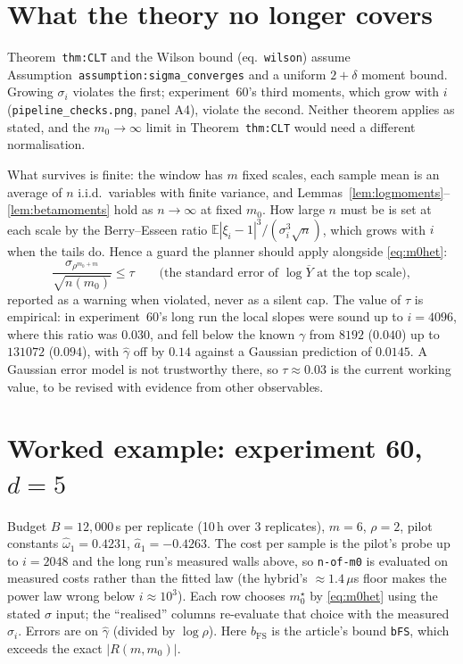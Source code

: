 \documentclass[11pt]{article}
\newcommand{\E}{\mathbb{E}}
\newcommand{\bFS}{b_{\mathrm{FS}}}
\begin{document}
\section{What the theory no longer covers}\label{sec:validity}

Theorem~\texttt{thm:CLT} and the Wilson bound (eq.~\texttt{wilson}) assume
Assumption~\texttt{assumption:}\allowbreak\texttt{sigma\_converges} and a uniform $2+\delta$ moment
bound. Growing $\sigma_i$ violates the first; experiment~60's third moments,
which grow with $i$ (\texttt{pipeline\_checks.png}, panel A4), violate the
second. Neither theorem applies as stated, and the $m_0\to\infty$ limit in
Theorem~\texttt{thm:CLT} would need a different normalisation.

What survives is finite: the window has $m$ fixed scales, each sample mean is an
average of $n$ i.i.d.\ variables with finite variance, and
Lemmas~\ref{lem:logmoments}--\ref{lem:betamoments} hold as $n\to\infty$ at fixed
$m_0$. How large $n$ must be is set at each scale by the Berry--Esseen ratio
$\E|\xi_i-1|^3/(\sigma_i^3\sqrt n)$, which grows with $i$ when the tails do. Hence
a guard the planner should apply alongside \eqref{eq:m0het}:
\begin{equation}
  \frac{\sigma_{\rho^{m_0+m}}}{\sqrt{n(m_0)}}\le\tau
  \qquad\text{(the standard error of $\log\overline Y$ at the top scale)},
  \label{eq:guard}
\end{equation}
reported as a warning when violated, never as a silent cap. The value of $\tau$
is empirical: in experiment~60's long run the local slopes were sound up to
$i=4096$, where this ratio was $0.030$, and fell below the known $\gamma$ from
$8192$ ($0.040$) up to $131072$ ($0.094$), with $\hat\gamma$ off by $0.14$
against a Gaussian prediction of $0.0145$. A Gaussian error model is not
trustworthy there, so $\tau\approx0.03$ is the current working value, to be
revised with evidence from other observables.

\section{Worked example: experiment 60, \texorpdfstring{$d=5$}{d=5}}

Budget $B=12{,}000$\,s per replicate (10\,h over 3 replicates), $m=6$,
$\rho=2$, pilot constants $\hat\omega_1=0.4231$, $\hat a_1=-0.4263$. The cost
per sample is the pilot's probe up to $i=2048$ and the long run's measured
walls above, so \texttt{n-of-m0} is evaluated on measured costs rather than
the fitted law (the hybrid's $\approx1.4\,\mu$s floor makes the power law wrong
below $i\approx10^3$). Each row chooses $m_0^\star$ by \eqref{eq:m0het} using
the stated $\sigma$ input; the ``realised'' columns re-evaluate that choice with
the measured $\hat\sigma_i$. Errors are on $\hat\gamma$ (divided by $\log\rho$).
Here $\bFS$ is the article's bound \texttt{bFS}, which exceeds the exact
$|R(m,m_0)|$.
\end{document}
